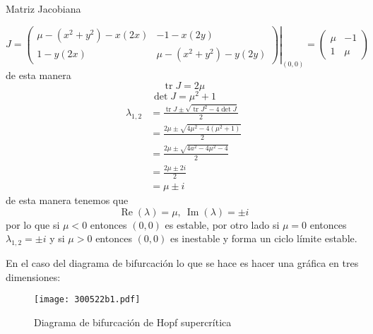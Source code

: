 Matriz Jacobiana

\begin{equation*}
	J = \left. \begin{pmatrix} \mu - (x^2+y^2) - x(2x) & -1-x(2y) \\ 1-y(2x) & \mu-(x^2+y^2) - y (2y) \end{pmatrix} 
		\right|_{(0,0)} = \begin{pmatrix} \mu & -1 \\ 1 & \mu \end{pmatrix}  
\end{equation*}
de esta manera
\begin{equation*}
  \operatorname{tr}J = 2\mu
\end{equation*}
\begin{equation*}
  \operatorname{det} J = \mu^2+1
\end{equation*}
\begin{align*}
	\lambda_{1,2} &= \frac{\operatorname{tr}J \pm \sqrt{\operatorname{tr}J^2 - 4 \operatorname{det} J} }{2} \\
	 &= \frac{2\mu \pm \sqrt{4 \mu^2 - 4 (\mu^2+1)}}{2} \\
	  &= \frac{2 \mu \pm \sqrt{4a^2-4\mu^2-4}}{2} \\
	   &= \frac{2\mu \pm 2i }{2} \\
	    &= \mu \pm i 
\end{align*}
de esta manera tenemos que $$\operatorname{Re}\left(\lambda \right)=\mu,\ \operatorname{Im}\left(\lambda \right) = \pm i $$
por lo que si $ \mu<0$ entonces  $(0,0)$ es estable, por otro lado si $ \mu=0$ entonces $\lambda_{1,2}=\pm i$ y si $ \mu>0$ entonces $(0,0)$ es inestable y forma un ciclo límite estable.

\begin{figure}[H]
 \centering
\end{figure}

En el caso del diagrama de bifurcación lo que se hace es hacer una gráfica en tres dimensiones:

\begin{figure}[H]
	\centering
	\texttt{[image: 300522b1.pdf]}
	\caption{Diagrama de bifurcación de Hopf supercrítica}
\end{figure}


